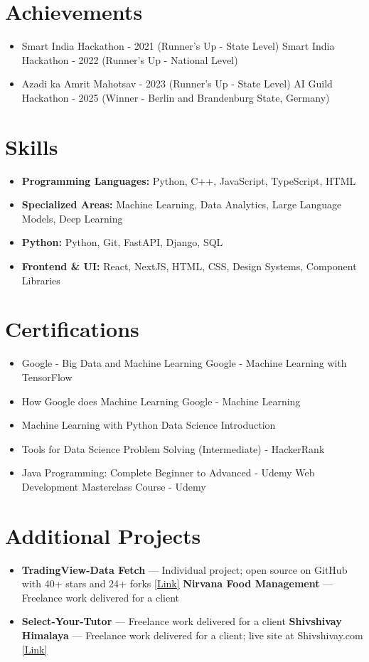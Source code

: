 \documentclass[a4paper,10pt]{article}
\begin{document}
\section*{Achievements}
\begin{itemize}
\item Smart India Hackathon - 2021 (Runner's Up - State Level) \hfill Smart India Hackathon - 2022 (Runner's Up - National Level)
\item Azadi ka Amrit Mahotsav - 2023 (Runner's Up - State Level) \hfill AI Guild Hackathon - 2025 (Winner - Berlin and Brandenburg State, Germany)
\end{itemize}

\section*{Skills}
\begin{itemize}
  \item \textbf{Programming Languages:} Python, C++, JavaScript, TypeScript, HTML
  \item \textbf{Specialized Areas:} Machine Learning, Data Analytics, Large Language Models, Deep Learning
  \item \textbf{Python:} Python, Git, FastAPI, Django, SQL
  \item \textbf{Frontend \& UI:} React, NextJS, HTML, CSS, Design Systems, Component Libraries
\end{itemize}

\section*{Certifications}
\begin{itemize}
\item Google - Big Data and Machine Learning \hfill Google - Machine Learning with TensorFlow
\item How Google does Machine Learning \hfill Google - Machine Learning
\item Machine Learning with Python \hfill Data Science Introduction
\item Tools for Data Science \hfill Problem Solving (Intermediate) - HackerRank
\item Java Programming: Complete Beginner to Advanced - Udemy \hfill Web Development Masterclass Course - Udemy
\end{itemize}

\section*{Additional Projects}
\begin{itemize}
\item \textbf{TradingView-Data Fetch} — Individual project; open source on GitHub with 40+ stars and 24+ forks \href{https://github.com/ravalmeet/TradingView}{[Link]} \hfill \textbf{Nirvana Food Management} — Freelance work delivered for a client
\item \textbf{Select-Your-Tutor} — Freelance work delivered for a client \hfill \textbf{Shivshivay Himalaya} — Freelance work delivered for a client; live site at Shivshivay.com \href{Shivshivay.com}{[Link]}
\end{itemize}
\end{document}

